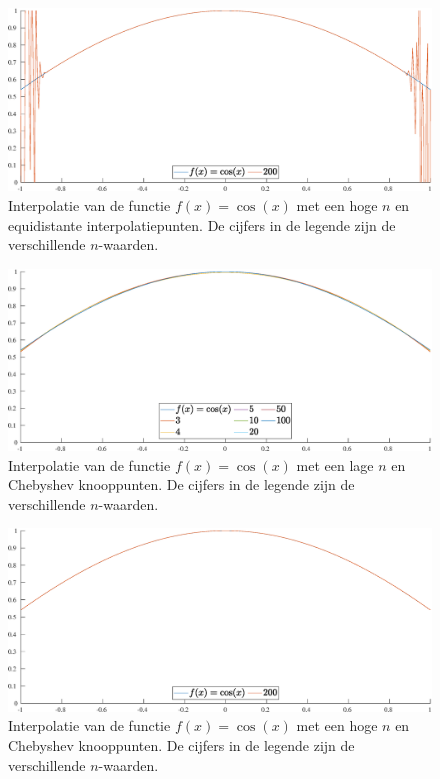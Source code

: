 \documentclass[a4paper, 12pt, titlepage, fleqn]{article}
\begin{document}
\begin{figure}
\centering
\includegraphics[scale=0.4]{../Afbeeldingen/cos_equi_hoog.eps}
\caption{Interpolatie van de functie $f(x) = \cos(x)$ met een hoge $n$ en equidistante interpolatiepunten. De cijfers in de legende zijn de verschillende $n$-waarden.}
\label{fig:hogeNCosEqui}
\end{figure}

\begin{figure}
\centering
\includegraphics[scale=0.4]{../Afbeeldingen/cos_nul_laag.eps}
\caption{Interpolatie van de functie $f(x) = \cos(x)$ met een lage $n$ en Chebyshev knooppunten. De cijfers in de legende zijn de verschillende $n$-waarden.}
\label{fig:lageNCosNul}
\end{figure}

\begin{figure}
\centering
\includegraphics[scale=0.4]{../Afbeeldingen/cos_nul_hoog.eps}
\caption{Interpolatie van de functie $f(x) = \cos(x)$ met een hoge $n$ en Chebyshev knooppunten. De cijfers in de legende zijn de verschillende $n$-waarden.}
\label{fig:hogeNCosNul}
\end{figure}
\end{document}
